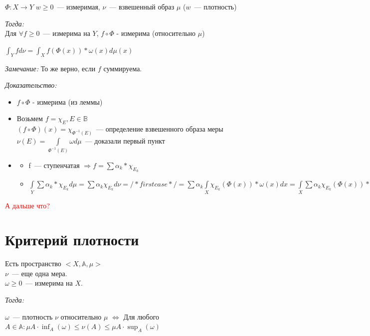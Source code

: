\documentclass[paper=a4, fontsize=17pt]{article}
\begin{document}
		$\Phi: X\rightarrow Y$
        $w \geq 0$~--- измеримая, $\nu$~--- взвешенный образ $\mu$ ($w$~--- плотность)

		\emph{Тогда:}\\
		 Для $\forall f \geq 0$~--- измерима на $Y$, $f\circ \Phi$ - измерима (относительно $\mu$)

		$\int_{Y}f d\nu = \int_{X} f(\Phi(x)) * \omega(x) d\mu(x)$

		\emph{Замечание:} То же верно, если $f$ суммируема.

		\emph{Доказательство:}

			\begin{itemize}
				\item $f\circ \Phi$ - измерима (из леммы)
				\item Возьмем $f = \chi_{E} , E\in \mathds{B}$ \\
				$(f\circ \Phi)(x) = \chi_{\Phi^{-1}(E)}$~--- определение взвешенного образа меры \\
				$\nu(E) = \int\limits_{\Phi^{-1}(E)}\omega d\mu$~--- доказали первый пункт
				\item
				\begin{itemize}
					\item f~--- ступенчатая $\Rightarrow f = \sum \alpha_k * \chi_{E_k}$
					\item $\int\limits_{Y} \sum \alpha_k * \chi_{E_k} d\mu = \sum \alpha_k \chi_{E_k} d\nu = /* first case */ = \sum \alpha_k \int\limits_X \chi_{E_k}(\Phi(x))*\omega(x)dx = \int\limits_X \sum \alpha_k \chi_{E_k}(\Phi(x)) * \omega(x) d\mu(x) = \int f \circ \Phi * \omega d\mu$
				\end{itemize}
			\end{itemize}
        \textcolor{red}{А дальше что?}
\section{Критерий плотности}
	Есть пространство $<X, \mathbb{A}, \mu>$ \\
	$\nu$~--- еще одна мера. \\
	$\omega \geq 0$~--- измерима на $X$.

	\emph{Тогда:}

	$\omega$~--- плотность $\nu$ относительно $\mu$ $\Longleftrightarrow$ Для любого $A\in\mathbb{A}:\mu A \cdot \inf_A(\omega) \leq \nu(A) \leq \mu A \cdot \sup_A(\omega)$
\end{document}

